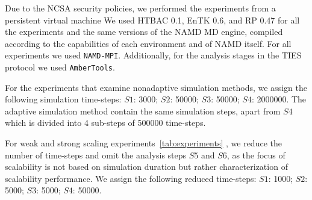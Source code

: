 

Due to the NCSA security policies, we performed the experiments from a
persistent virtual machine 
We used HTBAC 0.1, EnTK 0.6, and RP 0.47 for all the experiments and the same
versions of the NAMD MD engine, compiled according to the capabilities of
each environment and of NAMD itself. For all experiments we used
\texttt{NAMD-MPI}. Additionally, for the analysis stages in the TIES protocol
we used \texttt{AmberTools}.

For the experiments that examine nonadaptive simulation methods, we assign the 
following simulation time-steps: $S1$: 3000; $S2$: 50000; $S3$: 50000; $S4$: 
2000000. The adaptive simulation method contain the same simulation steps, apart 
from $S4$ which is divided into 4 sub-steps of 500000 time-steps. 

For weak and strong scaling experiments~\ref{tab:experiments} 
, 
we reduce the number of time-steps and omit the analysis steps $S5$ and $S6$, as 
the focus of scalability is not based on simulation duration but rather 
characterization of scalability performance. We assign the following reduced
time-steps: $S1$: 1000; $S2$: 5000; $S3$: 5000; $S4$: 50000. 




